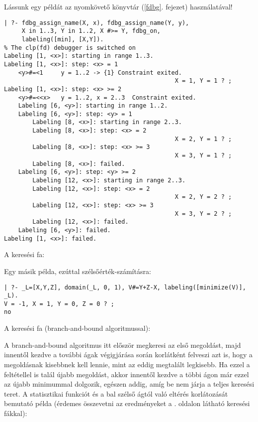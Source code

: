 Lássunk egy példát az \fdbg nyomkövető könyvtár (\ref{fdbg}. fejezet) használatával!
\br
\begin{verbatim}
| ?- fdbg_assign_name(X, x), fdbg_assign_name(Y, y),
     X in 1..3, Y in 1..2, X #>= Y, fdbg_on,
     labeling([min], [X,Y]).
% The clp(fd) debugger is switched on
Labeling [1, <x>]: starting in range 1..3.
Labeling [1, <x>]: step: <x> = 1
    <y>#=<1     y = 1..2 -> {1} Constraint exited.
                                                X = 1, Y = 1 ? ;
Labeling [1, <x>]: step: <x> >= 2
    <y>#=<<x>   y = 1..2, x = 2..3  Constraint exited.
    Labeling [6, <y>]: starting in range 1..2.
    Labeling [6, <y>]: step: <y> = 1
        Labeling [8, <x>]: starting in range 2..3.
        Labeling [8, <x>]: step: <x> = 2
                                                X = 2, Y = 1 ? ;
        Labeling [8, <x>]: step: <x> >= 3
                                                X = 3, Y = 1 ? ;
        Labeling [8, <x>]: failed.
    Labeling [6, <y>]: step: <y> >= 2
        Labeling [12, <x>]: starting in range 2..3.
        Labeling [12, <x>]: step: <x> = 2
                                                X = 2, Y = 2 ? ;
        Labeling [12, <x>]: step: <x> >= 3
                                                X = 3, Y = 2 ? ;
        Labeling [12, <x>]: failed.
    Labeling [6, <y>]: failed.
Labeling [1, <x>]: failed.
\end{verbatim}

A keresési fa:

\begin{center}
\end{center}

Egy másik példa, ezúttal szélsőérték-számításra:

\begin{verbatim}
| ?- _L=[X,Y,Z], domain(_L, 0, 1), V#=Y+Z-X, labeling([minimize(V)], _L).
V = -1, X = 1, Y = 0, Z = 0 ? ;
no
\end{verbatim}

A keresési fa (branch-and-bound algoritmussal):

\begin{center}
\end{center}

A branch-and-bound algoritmus itt először megkeresi az első megoldást, majd innentől
kezdve a további ágak végigjárása során korlátként felveszi azt is, hogy a megoldásnak
kisebbnek kell lennie, mint az eddig megtalált legkisebb. Ha ezzel a feltétellel is
talál újabb megoldást, akkor innentől kezdve a többi ágon már ezzel az újabb minimummal
dolgozik, egészen addig, amíg be nem járja a teljes keresési teret.
\br
A statisztikai funkciót  és a bal szélső ágtól való eltérés korlátozását bemutató példa
(érdemes összevetni az eredményeket a \pageref{kerfak}. oldalon látható keresési
fákkal):

